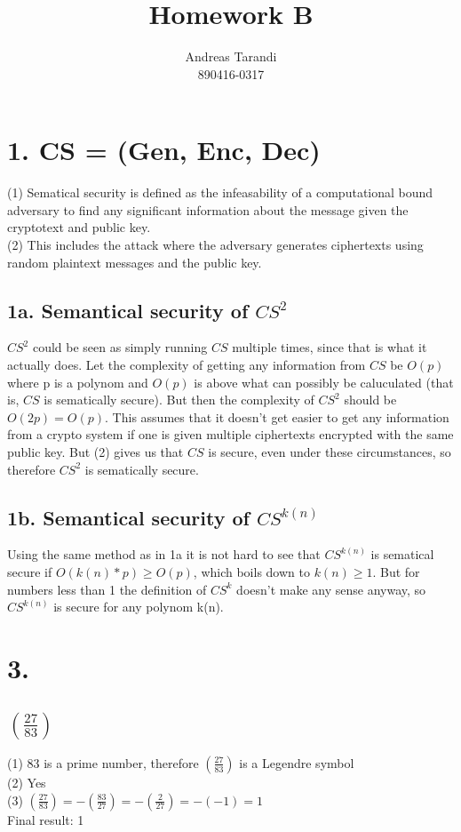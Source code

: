 \documentclass[a4paper,11pt]{article}
\author{Andreas Tarandi\\890416-0317}
\title{Homework B}
\def\lag[#1]#2{\left(\frac{#1}{#2}\right) }
\begin{document}
	\maketitle

	\section*{1. CS = (Gen, Enc, Dec)}
		(1) Sematical security is defined as the infeasability of a computational bound adversary to find any significant information about the message given the cryptotext and public key. \\
		(2) This includes the attack where the adversary generates ciphertexts using random plaintext messages and the public key.
	
	\subsection*{1a. Semantical security of $CS^2$}
		$CS^2$ could be seen as simply running $CS$ multiple times, since that is what it actually does. 
		Let the complexity of getting any information from $CS$ be $O(p)$ where p is a polynom and $O(p)$ is above what can possibly be caluculated (that is, $CS$ is sematically secure). 
		But then the complexity of $CS^2$ should be $O(2p) = O(p)$. This assumes that it doesn't get easier to get any information from a crypto system if one is given multiple ciphertexts encrypted with the same public key.
		But (2) gives us that $CS$ is secure, even under these circumstances, so therefore $CS^2$ is sematically secure.

	\subsection*{1b. Semantical security of $CS^{k(n)}$}
		Using the same method as in 1a it is not hard to see that $CS^{k(n)}$ is sematical 
		secure if $O(k(n)*p) \ge O(p)$, which boils down to $k(n) \ge 1$. 
		But for numbers less than 1 the definition of $CS^k$ doesn't make any sense anyway, so $CS^{k(n)}$ is secure for any polynom k(n).


	\section*{3.}
	\subsection*{$\lag[27]{83}$}
		(1) 83 is a prime number, therefore $\lag[27]{83}$ is a Legendre symbol\\
		(2) Yes\\
		(3) $\lag[27]{83} = -\lag[83]{27} = -\lag[2]{27} = -(-1) = 1$\\
		Final result: 1 
\end{document}
